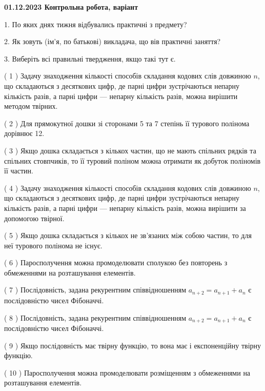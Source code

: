 \documentclass[12pt, ukrainian]{article}
\begin{document}
\vspace{4mm}
\newpage
\begin {large}

\textbf{01.12.2023 Контрольна робота, варіант  }\par


{
1. По яких днях тижня відбувались практичні з предмету?



\vspace{5mm}
2. Як зовуть (ім'я, по батькові) викладача, що вів практичні заняття?



\vspace{5mm}
3. Виберіть всі правильні твердження, якщо такі тут є.\par
\vspace{2mm}
( 1 ) Задачу знаходження кількості способів складання кодових слів довжиною $n$, що складаються з десяткових цифр, де парні цифри зустрічаються непарну кількість разів, а парні цифри — непарну кількість разів, можна вирішити методом твірних.%

( 2 ) Для прямокутної дошки зі сторонами 5 та 7 степінь її турового полінома дорівнює 12.%

( 3 ) Якщо дошка складається з кількох частин, що не мають спільних рядків та спільних стовпчиків, то її туровий поліном можна отримати як добуток поліномів її частин.%

( 4 ) Задачу знаходження кількості способів складання кодових слів довжиною $n$, що складаються з десяткових цифр, де парні цифри зустрічаються непарну кількість разів, а парні цифри — непарну кількість разів, можна вирішити за допомогою твірної.%

( 5 ) Якщо дошка складається з кількох не зв’язаних між собою частин, то для неї турового полінома не існує.%

( 6 ) Паросполучення можна промоделювати сполукою без повторень з обмеженнями на розташування елементів.%

( 7 ) Послідовність, задана рекурентним співвідношенням $a_{n+2}=a_{n+1}+a_{n}$ є послідовністю чисел Фібоначчі.%

( 8 ) Послідовність, задана рекурентним співвідношенням $a_{n+2}=a_{n+1}+a_{n}$ є послідовністю чисел Фібоначчі.%

( 9 ) Якщо послідовність має твірну функцію, то вона має і експоненційну твірну функцію.%

( 10 ) Паросполучення можна промоделювати розміщенням з обмеженнями на розташування елементів.%
}
\end {large}
\end{document}
